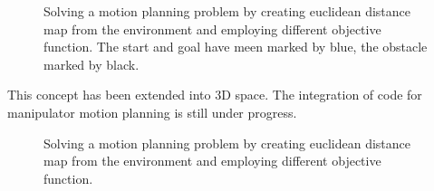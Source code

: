 \documentclass[letterpaper, 9pt, conference]{ieeeconf}  %
\begin{document}
\begin{figure}
\caption{Solving a motion planning problem by creating euclidean distance map from the environment and employing different objective function. The start and goal have meen marked by blue, the obstacle marked by black.}
\label{sample_based_optimization_based_problem1}
\end{figure}


This concept has been extended into 3D space. The integration of code for manipulator motion planning is still under progress.













\begin{figure}
\centering
{}


\caption{Solving a motion planning problem by creating euclidean distance map from the environment and employing different objective function.}
\label{sample_based_optimization_based_problem2}
\end{figure}
\end{document}
